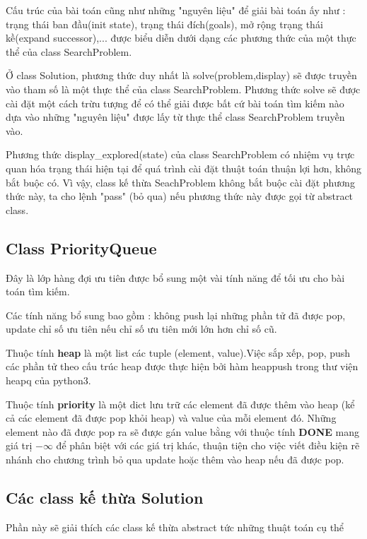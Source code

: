 \documentclass[11pt]{article} %
\begin{document}
Cấu trúc của bài toán cũng như những "nguyên liệu" để giải bài toán ấy như : trạng thái ban đầu(init state), trạng thái đích(goals), mở rộng trạng thái kề(expand successor)\cite{csttnt_lhb},... được biểu diễn dưới dạng các phương thức của một thực thể của class SearchProblem. 

Ở class Solution, phương thức duy nhất là solve(problem,display) sẽ được truyền vào tham số là một thực thể của class SearchProblem. Phương thức solve sẽ được cài đặt một cách trừu tượng để có thể giải được bất cứ bài toán tìm kiếm nào dựa vào những "nguyên liệu" được lấy từ thực thể class SearchProblem truyền vào.

Phương thức display\_explored(state) của class SearchProblem có nhiệm vụ trực quan hóa trạng thái hiện tại để quá trình cài đặt thuật toán thuận lợi hơn, không bắt buộc có. Vì vậy, class kế thừa SeachProblem không bắt buộc cài đặt phương thức này, ta cho lệnh "pass" (bỏ qua) nếu phương thức này được gọi từ abstract class.

\subsection{Class PriorityQueue}
Đây là lớp hàng đợi ưu tiên được bổ sung một vài tính năng để tối ưu cho bài toán tìm kiếm.

Các tính năng bổ sung bao gồm : không push lại những phần tử đã được pop, update chỉ số ưu tiên nếu chỉ số ưu tiên mới lớn hơn chỉ số cũ. 


Thuộc tính \textbf{heap} là một list các tuple (element, value).Việc sắp xếp, pop, push các phần tử theo cấu trúc heap được thực hiện bởi hàm heappush trong thư viện heapq của python3.

Thuộc tính \textbf{priority} là một dict lưu trữ các element đã được thêm vào heap (kể cả các element đã được pop khỏi heap) và value của mỗi element đó. Những element nào đã được pop ra sẽ được gán value bằng với thuộc tính \textbf{DONE} mang giá trị $- \infty$ để phân biệt với các giá trị khác, thuận tiện cho việc viết điều kiện rẽ nhánh cho chương trình bỏ qua update hoặc thêm vào heap nếu đã được pop.
\subsection{Các class kế thừa Solution}
Phần này sẽ giải thích các class kế thừa abstract tức những thuật toán cụ thể
\end{document}
